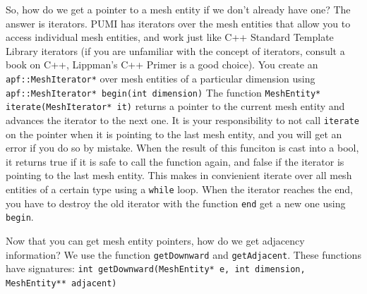 \documentclass[12pt]{article}
\newcommand{\ttt}{\texttt}
\begin{document}
So, how do we get a pointer to a mesh entity if we don't already have one?  
The answer is iterators.  
PUMI has iterators over the mesh entities that allow you to access individual mesh entities, and work just like C++ Standard Template Library iterators (if you are unfamiliar with the concept of iterators, consult a book on C++, Lippman's C++ Primer is a good choice). 
You create an \ttt{apf::MeshIterator*} over mesh entities of a particular dimension using
\newline
\newline
\noindent\ttt{apf::MeshIterator* begin(int dimension)} 
\newline
\newline
\noindent The function 
\newline
\newline
\noindent\ttt{MeshEntity* iterate(MeshIterator* it)}
\newline
\newline
\noindent returns a pointer to the current mesh entity and advances the iterator to the next one.  
It is your responsibility to not call \ttt{iterate} on the pointer when it is pointing to the last mesh entity, and you will get an error if you do so by mistake.  
When the result of this funciton is cast into a bool, it returns true if it is safe to call the function again, and false if the iterator is pointing to the last mesh entity.
This makes in convienient iterate over all mesh entities of a certain type using a \ttt{while} loop.
When the iterator reaches the end, you have to destroy the old iterator with the function \ttt{end} get a new one using \ttt{begin}.

Now that you can get mesh entity pointers, how do we get adjacency information?  
We use the function \ttt{getDownward} and \ttt{getAdjacent}. 
These functions have signatures:
\newline
\newline
\noindent\ttt{int getDownward(MeshEntity* e, int dimension, MeshEntity** adjacent)}
\end{document}
